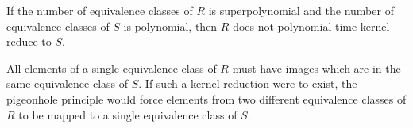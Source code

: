 \begin{theorem}
  If the number of equivalence classes of $R$ is superpolynomial and the number of equivalence classes of $S$ is polynomial, then $R$ does not polynomial time kernel reduce to $S$.
\end{theorem}
\vspace{1cm}
\begin{proofidea}
  All elements of a single equivalence class of $R$ must have images which are in the same equivalence class of $S$.
  If such a kernel reduction were to exist, the pigeonhole principle would force elements from two different equivalence classes of $R$ to be mapped to a single equivalence class of $S$.
\end{proofidea}
